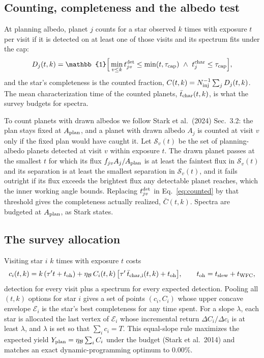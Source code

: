 \documentclass[11pt,a4paper]{article}
\begin{document}
\subsection{Counting, completeness and the albedo test}
\label{sec:counting}

At planning albedo, planet $j$ counts for a star observed $k$ times with exposure $t$ per visit if
it is detected on at least one of those visits and its spectrum fits under the cap:
\begin{equation}
D_j(t, k) = \mathbb{1}\Big[\min_{v \le k} t^{\rm det}_{jv} \le \min(t, \tau_{\rm cap})\ \wedge\
t^{\rm char}_j \le \tau_{\rm cap}\Big],
\label{eq:counted}
\end{equation}
and the star's completeness is the counted fraction,
$C(t, k) = N_{\rm inj}^{-1}\sum_j D_j(t, k)$. The mean characterization time of the counted
planets, $\bar t_{\rm char}(t, k)$, is what the survey budgets for spectra.

To count planets with drawn albedos we follow Stark et al.\ (2024) Sec.~3.2: the plan stays fixed
at $A_{\rm plan}$, and a planet with drawn albedo $A_j$ is counted at visit $v$ only if the fixed
plan would have caught it. Let $\mathcal{S}_v(t)$ be the set of planning-albedo planets detected
at visit $v$ within exposure $t$. The drawn planet passes at the smallest $t$ for which its flux
$f_{jv}A_j/A_{\rm plan}$ is at least the faintest flux in $\mathcal{S}_v(t)$ and its separation is
at least the smallest separation in $\mathcal{S}_v(t)$, and it fails outright if its flux exceeds
the brightest flux any detectable planet reaches, which the inner working angle bounds. Replacing
$t^{\rm det}_{jv}$ in Eq.~\eqref{eq:counted} by that threshold gives the completeness actually
realized, $\bar C(t, k)$. Spectra are budgeted at $A_{\rm plan}$, as Stark states.

\subsection{The survey allocation}

Visiting star $i$ $k$ times with exposure $t$ costs
\begin{equation}
c_i(t, k) = k\,(\tau' t + t_{\rm oh}) +
\eta_\mathcal{B}\,C_i(t, k)\,\big[\tau'\,\bar t_{\rm char,i}(t, k) + t_{\rm oh}\big],
\qquad t_{\rm oh} = t_{\rm slew} + t_{\rm WFC},
\label{eq:cost}
\end{equation}
detection for every visit plus a spectrum for every expected detection. Pooling all
$(t, k)$ options for star $i$ gives a set of points $(c_i, C_i)$ whose upper concave envelope
$\mathcal{E}_i$ is the star's best completeness for any time spent. For a slope $\lambda$, each
star is allocated the last vertex of $\mathcal{E}_i$ whose incremental return
$\Delta C_i/\Delta c_i$ is at least $\lambda$, and $\lambda$ is set so that
$\sum_i c_i = T$. This equal-slope rule maximizes the expected yield
$Y_{\rm plan} = \eta_\mathcal{B}\sum_i C_i$ under the budget (Stark et al.\ 2014) and matches an
exact dynamic-programming optimum to 0.00\%.
\end{document}

